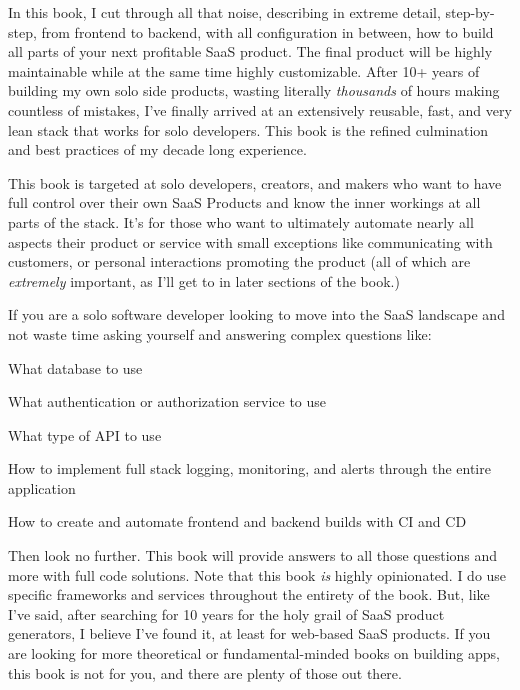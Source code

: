 \documentclass[a4paper,
                             oneside,
                             BCOR1.0cm,
                             DIV11,
                             parskip=full,
                             11pt]{scrbook}
\begin{document}
In this book, I cut through all that noise, describing in extreme detail, step-by-step, from frontend to backend, with all configuration in between, how to build all parts of your next profitable SaaS product. The final product will be highly maintainable while at the same time highly customizable.  After 10+ years of building my own solo side products, wasting literally \textit{thousands} of hours making countless of mistakes, I've finally arrived at an extensively reusable, fast, and very lean stack that works for solo developers. This book is the refined culmination and best practices of my decade long experience.


This book is targeted at solo developers, creators, and makers who want to have full control over their own SaaS Products and know the inner workings at all parts of the stack. It's for those who want to ultimately automate nearly all aspects their product or service with small exceptions like communicating with customers, or personal interactions promoting the product (all of which are \textit{extremely} important, as I'll get to in later sections of the book.)

If you are a solo software developer looking to move into the SaaS landscape and not waste time asking yourself and answering complex questions like:

\begin{arrows}
\item What database to use
\item What authentication or authorization service to use
\item What type of API to use
\item How to implement full stack logging, monitoring, and alerts through the entire application
\item How to create and automate frontend and backend builds with CI and CD
\end{arrows}

Then look no further. This book will provide answers to all those questions and more with full code solutions. Note that this book \textit{is} highly opinionated. I do use specific frameworks and services throughout the entirety of the book. But, like I've said, after searching for 10 years for the holy grail of SaaS product generators, I believe I've found it, at least for web-based SaaS products. If you are looking for more theoretical or fundamental-minded books on building apps, this book is not for you, and there are plenty of those out there.
\end{document}
